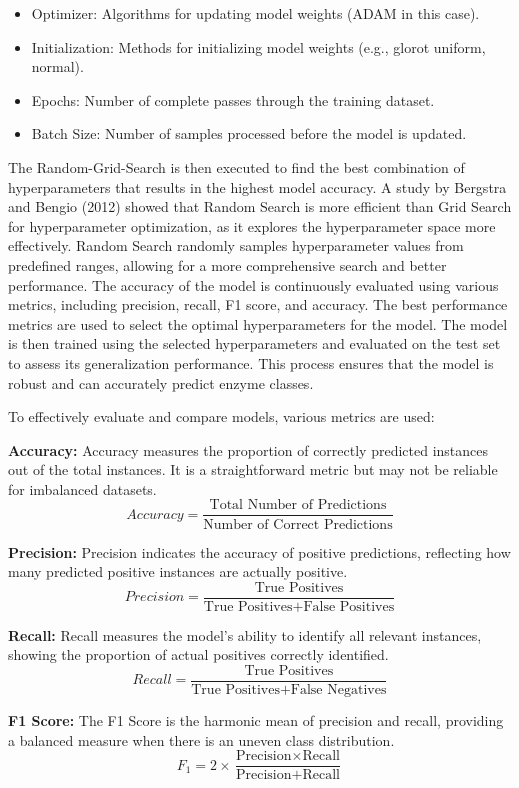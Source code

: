 \begin{itemize}
    \item Optimizer: Algorithms for updating model weights (ADAM in this case).
    \item Initialization: Methods for initializing model weights (e.g., glorot uniform, normal).
    \item Epochs: Number of complete passes through the training dataset.
    \item Batch Size: Number of samples processed before the model is updated.
\end{itemize}

The Random-Grid-Search is then executed to find the best combination of hyperparameters that results in the highest model accuracy. A study by Bergstra and Bengio (2012) showed that Random Search is more efficient than Grid Search for hyperparameter optimization, as it explores the hyperparameter space more effectively. Random Search randomly samples hyperparameter values from predefined ranges, allowing for a more comprehensive search and better performance. \autocite{bergstraRandomSearchHyperParameter}
The accuracy of the model is continuously evaluated using various metrics, including precision, recall, F1 score, and accuracy. The best performance metrics are used to select the optimal hyperparameters for the model. The model is then trained using the selected hyperparameters and evaluated on the test set to assess its generalization performance. This process ensures that the model is robust and can accurately predict enzyme classes.

To effectively evaluate and compare models, various metrics are used: \autocite{sudhamathyBayesianCNNLSTMClassification2023}

\textbf{Accuracy:} Accuracy measures the proportion of correctly predicted instances out of the total instances. It is a straightforward metric but may not be reliable for imbalanced datasets.
\begin{equation}
    Accuracy = \frac{\text{Total Number of Predictions}}{\text{Number of Correct Predictions}}
\end{equation}

\textbf{Precision:} Precision indicates the accuracy of positive predictions, reflecting how many predicted positive instances are actually positive.
\begin{equation}
    Precision = \frac{\text{True Positives}}{\text{True Positives} + \text{False Positives}}
\end{equation}

\textbf{Recall:} Recall measures the model’s ability to identify all relevant instances, showing the proportion of actual positives correctly identified.
\begin{equation}
    Recall = \frac{\text{True Positives}}{\text{True Positives} + \text{False Negatives}}
\end{equation}

\textbf{F1 Score:} The F1 Score is the harmonic mean of precision and recall, providing a balanced measure when there is an uneven class distribution.
\begin{equation}
    F_1 = 2 \times \frac{\text{Precision} \times \text{Recall}}{\text{Precision} + \text{Recall}}
\end{equation}